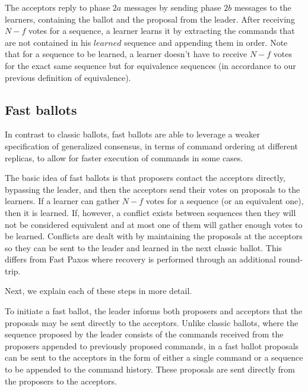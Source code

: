 The acceptors reply to phase $2a$ messages by sending phase $2b$ messages to the learners, containing the ballot and the proposal from the leader. After receiving $N-f$ votes for a sequence, a learner learns it by extracting the commands that are not contained in his $learned$ sequence and appending them in order. Note that for a sequence to be learned, a learner doesn't have to receive $N-f$ votes for the exact same sequence but for equivalence sequences (in accordance to our previous definition of equivalence).

\subsection{Fast ballots} 

In contrast to classic ballots, fast ballots are able to leverage a weaker specification of generalized consensus, in terms of command ordering at different replicas, to allow for faster execution of commands in some cases.

The basic idea of fast ballots is that proposers contact the acceptors directly, bypassing the leader, and then the acceptors send their votes on proposals to the learners. If a learner can gather $N-f$ votes for a sequence (or an equivalent one), then it is learned. If, however, a conflict exists between sequences then they will not be considered equivalent and at most one of them will gather enough votes to be learned. Conflicts are dealt with by maintaining the proposals at the acceptors so they can be sent to the leader and learned in the next classic ballot. This differs from Fast Paxos where recovery is performed through an additional round-trip. \par
Next, we explain each of these steps in more detail.


To initiate a fast ballot, the leader informs both proposers and acceptors that the proposals may be sent directly to the acceptors. Unlike classic ballots, where the sequence proposed by the leader consists of the commands received from the proposers appended to previously proposed commands, in a fast ballot proposals can be sent to the acceptors in the form of either a single command or a sequence to be appended to the command history. These proposals are sent directly from the proposers to the acceptors.

